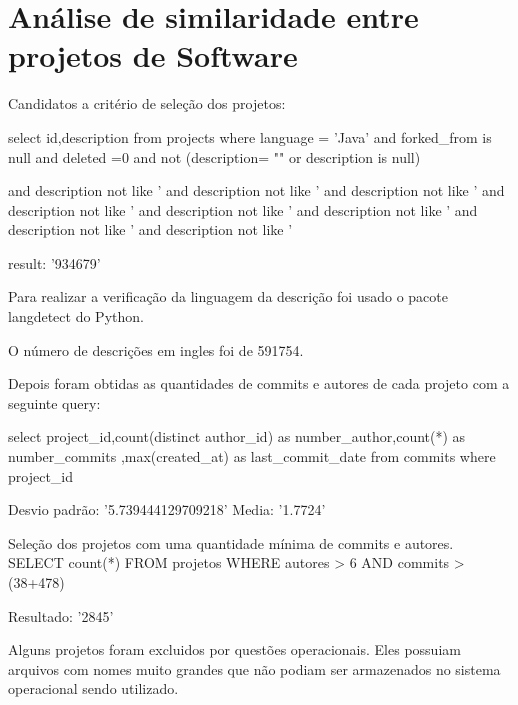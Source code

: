 \chapter{Análise de similaridade entre projetos de Software}

Candidatos a critério de seleção dos projetos:


select id,description from projects  where language = 'Java' and forked_from is null and deleted =0 and not (description= "" or description is null)

and description not like '%
and description not like '%
and description not like '%
and description not like '%
and description not like '%
and description not like '%
and description not like '%
and description not like '%


result: '934679'


Para realizar a verificação da linguagem da descrição foi usado o pacote langdetect do Python.

O número de descrições em ingles foi de 591754.

Depois foram obtidas as quantidades de commits e autores de cada projeto com a seguinte query:

select project_id,count(distinct author_id) as number_author,count(*) as number_commits ,max(created_at) as last_commit_date from commits where  project_id


Desvio padrão: '5.739444129709218'
Media: '1.7724'



Seleção dos projetos com uma quantidade mínima de commits e autores.
SELECT 
   count(*)
FROM
    projetos
WHERE
    autores > 6 AND commits > (38+478)


Resultado: '2845'


Alguns projetos foram excluidos por questões operacionais. Eles possuiam arquivos com nomes muito grandes que não podiam ser armazenados no sistema operacional sendo utilizado.

